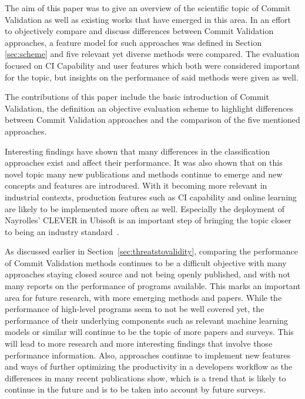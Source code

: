 The aim of this paper was to give an overview of the scientific topic of Commit Validation as well as existing works that have emerged in this area. In an effort to objectively compare and discuss differences between Commit Validation approaches, a feature model for such approaches was defined in Section \ref{sec:scheme} and five relevant yet diverse methods were compared. The evaluation focused on CI Capability and user features which both were considered important for the topic, but insights on the performance of said methods were given as well.

The contributions of this paper include the basic introduction of Commit Validation, the definition an objective evaluation scheme to highlight differences between Commit Validation approaches and the comparison of the five mentioned approaches.

Interesting findings have shown that many differences in the classification approaches exist and affect their performance. It was also shown that on this novel topic many new publications and methods continue to emerge and new concepts and features are introduced. With it becoming more relevant in industrial contexts, production features such as CI capability and online learning are likely to be implemented more often as well. Especially the deployment of Nayrolles' CLEVER in Ubisoft is an important step of bringing the topic closer to being an industry standard~\cite{Nayrolles2018}.

As discussed earlier in Section~\ref{sec:threatstovalidity}, %
comparing the performance of Commit Validation methods continues to be a difficult objective with many approaches staying closed source and not being openly published, and with not many reports on the performance of programs available. This marks an important area for future research, with more emerging methods and papers. 
While the performance of high-level programs seem to not be well covered yet, the performance of their underlying components such as relevant machine learning models or similar will continue to be the topic of more papers and surveys. This will lead to more research and more interesting findings that involve those performance information.
Also, approaches continue to implement new features and ways of further optimizing the productivity in a developers workflow as the differences in many recent publications show, which is a trend that is likely to continue in the future and is to be taken into account by future surveys.
